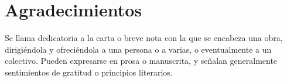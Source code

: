 \thispagestyle{plain}			%
\section*{Agradecimientos}

Se llama dedicatoria a la carta o breve nota con la que se encabeza una obra, dirigiéndola y ofreciéndola a una persona o a varias, o eventualmente a un colectivo. Pueden expresarse en prosa o manuscrita, y señalan generalmente sentimientos de gratitud o principios literarios.


\thispagestyle{empty}
\mbox{}